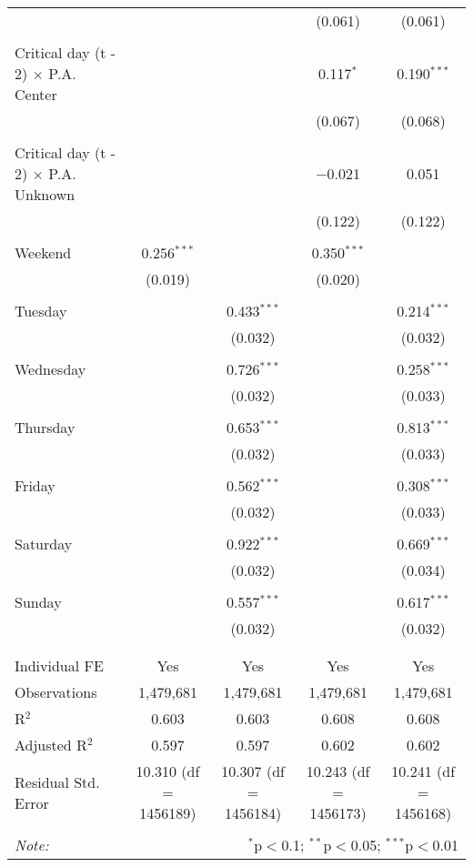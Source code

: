 \documentclass[
]{article}
\begin{document}
\begin{table}[!htbp]
{\begin{tabular}{@{\extracolsep{5pt}}lcccc}
  &  &  & (0.061) & (0.061) \\ 
  & & & & \\ 
 Critical day (t - 2) $\times$ P.A. Center &  &  & 0.117$^{*}$ & 0.190$^{***}$ \\ 
  &  &  & (0.067) & (0.068) \\ 
  & & & & \\ 
 Critical day (t - 2) $\times$ P.A. Unknown &  &  & $-$0.021 & 0.051 \\ 
  &  &  & (0.122) & (0.122) \\ 
  & & & & \\ 
 Weekend & 0.256$^{***}$ &  & 0.350$^{***}$ &  \\ 
  & (0.019) &  & (0.020) &  \\ 
  & & & & \\ 
 Tuesday &  & 0.433$^{***}$ &  & 0.214$^{***}$ \\ 
  &  & (0.032) &  & (0.032) \\ 
  & & & & \\ 
 Wednesday &  & 0.726$^{***}$ &  & 0.258$^{***}$ \\ 
  &  & (0.032) &  & (0.033) \\ 
  & & & & \\ 
 Thursday &  & 0.653$^{***}$ &  & 0.813$^{***}$ \\ 
  &  & (0.032) &  & (0.033) \\ 
  & & & & \\ 
 Friday &  & 0.562$^{***}$ &  & 0.308$^{***}$ \\ 
  &  & (0.032) &  & (0.033) \\ 
  & & & & \\ 
 Saturday &  & 0.922$^{***}$ &  & 0.669$^{***}$ \\ 
  &  & (0.032) &  & (0.034) \\ 
  & & & & \\ 
 Sunday &  & 0.557$^{***}$ &  & 0.617$^{***}$ \\ 
  &  & (0.032) &  & (0.032) \\ 
  & & & & \\ 
\hline \\[-1.8ex] 
Individual FE & Yes & Yes & Yes & Yes \\ 
Observations & 1,479,681 & 1,479,681 & 1,479,681 & 1,479,681 \\ 
R$^{2}$ & 0.603 & 0.603 & 0.608 & 0.608 \\ 
Adjusted R$^{2}$ & 0.597 & 0.597 & 0.602 & 0.602 \\ 
Residual Std. Error & 10.310 (df = 1456189) & 10.307 (df = 1456184) & 10.243 (df = 1456173) & 10.241 (df = 1456168) \\ 
\hline 
\hline \\[-1.8ex] 
\textit{Note:}  & \multicolumn{4}{r}{$^{*}$p$<$0.1; $^{**}$p$<$0.05; $^{***}$p$<$0.01} \\ 
\end{tabular}
} 
\end{table} 
\newpage
\end{document}
